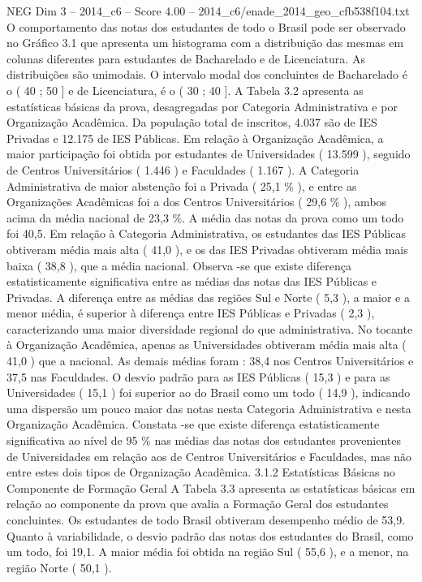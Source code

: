 \begin{textsample}{NEG Dim 3 – 2014\_c6 – Score 4.00 – 2014\_c6/enade\_2014\_geo\_cfb538f104.txt}
O comportamento das notas dos estudantes de todo o Brasil pode ser observado no Gráfico 3.1 que apresenta um histograma com a distribuição das mesmas em colunas diferentes para estudantes de Bacharelado e de Licenciatura.
As distribuições são unimodais.
O intervalo modal dos concluintes de Bacharelado é o ( 40 ; 50 ] e de Licenciatura, é o ( 30 ; 40 ].
A Tabela 3.2 apresenta as estatísticas básicas da prova, desagregadas por Categoria Administrativa e por Organização Acadêmica.
Da população total de inscritos, 4.037 são de IES Privadas e 12.175 de IES Públicas.
Em relação à Organização Acadêmica, a maior participação foi obtida por estudantes de Universidades ( 13.599 ), seguido de Centros Universitários ( 1.446 ) e Faculdades ( 1.167 ).
A Categoria Administrativa de maior abstenção foi a Privada ( 25,1 \% ), e entre as Organizações Acadêmicas foi a dos Centros Universitários ( 29,6 \% ), ambos acima da média nacional de 23,3 \%.
A média das notas da prova como um todo foi 40,5.
Em relação à Categoria Administrativa, os estudantes das IES Públicas obtiveram média mais alta ( 41,0 ), e os das IES Privadas obtiveram média mais baixa ( 38,8 ), que a média nacional.
Observa -se que existe diferença estatisticamente significativa entre as médias das notas das IES Públicas e Privadas.
A diferença entre as médias das regiões Sul e Norte ( 5,3 ), a maior e a menor média, é superior à diferença entre IES Públicas e Privadas ( 2,3 ), caracterizando uma maior diversidade regional do que administrativa.
No tocante à Organização Acadêmica, apenas as Universidades obtiveram média mais alta ( 41,0 ) que a nacional.
As demais médias foram : 38,4 nos Centros Universitários e 37,5 nas Faculdades.
O desvio padrão para as IES Públicas ( 15,3 ) e para as Universidades ( 15,1 ) foi superior ao do Brasil como um todo ( 14,9 ), indicando uma dispersão um pouco maior das notas nesta Categoria Administrativa e nesta Organização Acadêmica.
Constata -se que existe diferença estatisticamente significativa ao nível de 95 \% nas médias das notas dos estudantes provenientes de Universidades em relação aos de Centros Universitários e Faculdades, mas não entre estes dois tipos de Organização Acadêmica. 3.1.2 Estatísticas Básicas no Componente de Formação Geral A Tabela 3.3 apresenta as estatísticas básicas em relação ao componente da prova que avalia a Formação Geral dos estudantes concluintes.
Os estudantes de todo Brasil obtiveram desempenho médio de 53,9.
Quanto à variabilidade, o desvio padrão das notas dos estudantes do Brasil, como um todo, foi 19,1.
A maior média foi obtida na região Sul ( 55,6 ), e a menor, na região Norte ( 50,1 ).

\end{textsample}
